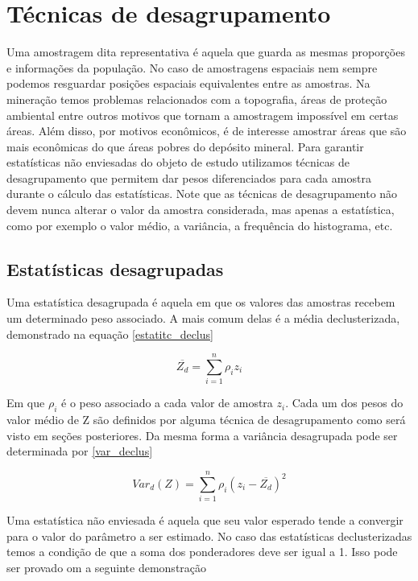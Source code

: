 \chapter{Técnicas de desagrupamento} \label{Cap_4}



Uma amostragem dita representativa é aquela que guarda as mesmas proporções e informações da população. No caso de amostragens espaciais nem sempre podemos resguardar posições espaciais equivalentes entre as amostras. Na mineração temos problemas relacionados com a topografia, áreas de proteção ambiental entre outros motivos que tornam a amostragem impossível em certas áreas. Além disso, por motivos econômicos, é de interesse amostrar áreas que são mais econômicas do que áreas pobres do depósito mineral. Para garantir estatísticas não enviesadas do objeto de estudo utilizamos técnicas de desagrupamento que permitem dar pesos diferenciados para cada amostra durante o cálculo das estatísticas. Note que as técnicas de desagrupamento não devem nunca alterar o valor da amostra considerada, mas apenas a estatística, como por exemplo o valor médio, a variância, a frequência do histograma, etc.

\section{Estatísticas desagrupadas} \label{demons_krig} 

Uma estatística desagrupada é aquela em que os valores das amostras recebem um determinado peso associado. A mais comum delas é a média declusterizada, demonstrado na equação \eqref{estatitc_declus}

\begin{equation}\label{estatitc_declus}
	\overline{Z_{d}} = \sum_{i=1}^{n} \rho _{i}z_{i}
\end{equation}

Em que $\rho _{i}$ é o peso associado a cada valor de amostra $z_{i}$. Cada um dos pesos do valor médio de Z são definidos por alguma técnica de desagrupamento como será visto em seções posteriores. Da mesma forma a variância desagrupada pode ser determinada por \eqref{var_declus}
 
 \begin{equation}\label{var_declus}
 Var_{d}(Z) = \sum_{i=1}^{n} \rho _{i} \left( z_{i} - \overline{Z_{d}} \right)^2
 \end{equation}
 
 Uma estatística não enviesada é aquela que seu valor esperado tende a convergir para o valor do parâmetro a ser estimado. No caso das estatísticas declusterizadas temos a condição de que a soma dos ponderadores deve ser igual a 1. Isso pode ser provado om a seguinte demonstração
 
